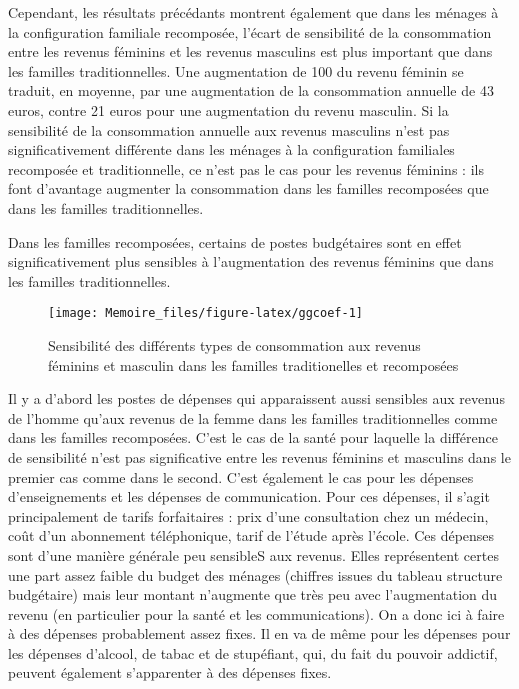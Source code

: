 \documentclass[
  12pt,
]{book}
\begin{document}
Cependant, les résultats précédants montrent également que dans les
ménages à la configuration familiale recomposée, l'écart de sensibilité
de la consommation entre les revenus féminins et les revenus masculins
est plus important que dans les familles traditionnelles. Une
augmentation de 100 du revenu féminin se traduit, en moyenne, par une
augmentation de la consommation annuelle de 43 euros, contre 21 euros
pour une augmentation du revenu masculin. Si la sensibilité de la
consommation annuelle aux revenus masculins n'est pas significativement
différente dans les ménages à la configuration familiales recomposée et
traditionnelle, ce n'est pas le cas pour les revenus féminins : ils font
d'avantage augmenter la consommation dans les familles recomposées que
dans les familles traditionnelles.

Dans les familles recomposées, certains de postes budgétaires sont en
effet significativement plus sensibles à l'augmentation des revenus
féminins que dans les familles traditionnelles.

\begin{figure}[H]

{\centering \texttt{[image: Memoire\_files/figure-latex/ggcoef-1]} 

}

\caption{Sensibilité des différents types de consommation aux revenus féminins et masculin dans les familles traditionelles et recomposées}\label{fig:ggcoef}
\end{figure}

Il y a d'abord les postes de dépenses qui apparaissent aussi sensibles
aux revenus de l'homme qu'aux revenus de la femme dans les familles
traditionnelles comme dans les familles recomposées. C'est le cas de la
santé pour laquelle la différence de sensibilité n'est pas significative
entre les revenus féminins et masculins dans le premier cas comme dans
le second. C'est également le cas pour les dépenses d'enseignements et
les dépenses de communication. Pour ces dépenses, il s'agit
principalement de tarifs forfaitaires : prix d'une consultation chez un
médecin, coût d'un abonnement téléphonique, tarif de l'étude après
l'école. Ces dépenses sont d'une manière générale peu sensibleS aux
revenus. Elles représentent certes une part assez faible du budget des
ménages (chiffres issues du tableau structure budgétaire) mais leur
montant n'augmente que très peu avec l'augmentation du revenu (en
particulier pour la santé et les communications). On a donc ici à faire
à des dépenses probablement assez fixes. Il en va de même pour les
dépenses pour les dépenses d'alcool, de tabac et de stupéfiant, qui, du
fait du pouvoir addictif, peuvent également s'apparenter à des dépenses
fixes.
\end{document}
